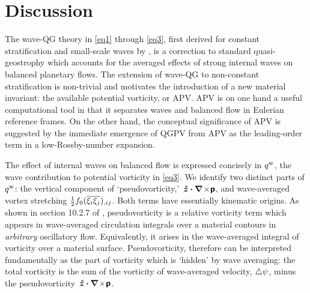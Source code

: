 \documentclass[12pt, oneside]{book}
\begin{document}
\section{Discussion}
\label{discussion}

The wave-QG theory in \eqref{eq1} through \eqref{eq3}, first derived for constant stratification and small-scale waves by \cite{BuhlerMcIntyre}, is a correction to standard quasi-geostrophy which accounts for the averaged effects of strong internal waves on balanced planetary flows.  The extension of wave-QG to non-constant stratification is non-trivial and motivates the introduction of a new material invariant: the available potential vorticity, or APV.  APV is on one hand a useful computational tool in that it separates waves and balanced flow in Eulerian reference frames.  On the other hand, the conceptual significance of APV is suggested by the immediate emergence of QGPV from APV as the leading-order term in a low-Rossby-number expansion.


The effect of internal waves on balanced flow is expressed concisely in $q^{\mathrm{w}}$, the wave contribution to potential vorticity in \eqref{eq3}.  We identify two distinct parts of $q^{\mathrm{w}}$: the vertical component of `pseudovorticity,' $\hspace{0.1em}\boldsymbol{\hat z} \boldsymbol \cdot \boldsymbol \nabla \!\times\! \boldsymbol{\mathsf{p}}$, and wave-averaged vortex stretching $\tfrac{1}{2} f_0 ( \overline{ \xi_i \xi_j } )_{,ij}$.  Both terms have essentially kinematic origins.  As shown in section 10.2.7 of \cite{Buhler}, pseudovorticity is a relative vorticity term which appears in wave-averaged circulation integrals over a material contours in {\it arbitrary} oscillatory flow.  Equivalently, it arises in the wave-averaged integral of vorticity over a material surface.  
Pseudovorticity, therefore can be interpreted fundamentally as the part of vorticity which is `hidden' by wave averaging: the total vorticity is the sum of the vorticity of wave-averaged velocity, $\triangle \psi$, minus the pseudovorticity $\hspace{0.1em}\boldsymbol{\hat z} \boldsymbol \cdot \boldsymbol \nabla \!\times\! \boldsymbol{\mathsf{p}}$.
\end{document}
